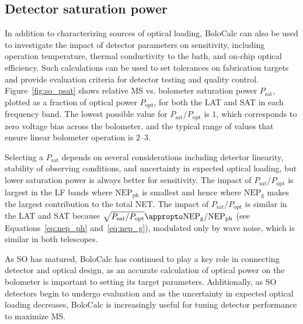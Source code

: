 
\subsection{Detector saturation power}
\label{sec:bolocalc_so_psat_optimization}

In addition to characterizing sources of optical loading, BoloCalc can also be used to investigate the impact of detector parameters on sensitivity, including operation temperature, thermal conductivity to the bath, and on-chip optical efficiency. Such calculations can be used to set tolerances on fabrication targets and provide evaluation criteria for detector testing and quality control. Figure~\ref{fig:so_psat} shows relative MS vs. bolometer saturation power $P_{\mathrm{sat}}$, plotted as a fraction of optical power $P_{\mathrm{opt}}$, for both the LAT and SAT in each frequency band. The lowest possible value for $P_{\mathrm{sat}} / P_{\mathrm{opt}}$ is $1$, which corresponds to zero voltage bias across the bolometer, and the typical range of values that ensure linear bolometer operation is 2--3. 

Selecting a $P_{\mathrm{sat}}$ depends on several considerations including detector linearity, 
stability of observing conditions,
and uncertainty in expected optical loading, but lower saturation power is always better for sensitivity. The impact of $P_{\mathrm{sat}} / P_{\mathrm{opt}}$ is largest in the LF bands where $\mathrm{NEP}_{\mathrm{ph}}$ is smallest and hence where $\mathrm{NEP}_{\mathrm{g}}$ makes the largest contribution to the total NET. The impact of $P_{\mathrm{sat}} / P_{\mathrm{opt}}$ is similar in the LAT and SAT because $\sqrt{P_{\mathrm{sat}} / P_{\mathrm{opt}}} \appropto \mathrm{NEP}_{\mathrm{g}} / \mathrm{NEP}_{\mathrm{ph}}$ (see Equations~\ref{eq:nep_ph} and~\ref{eq:nep_g}), modulated only by wave noise, which is similar in both telescopes. 

As SO has matured, BoloCalc has continued to play a key role in connecting detector and optical design, as an accurate calculation of optical power on the bolometer is important to setting its target parameters. Additionally, as SO detectors begin to undergo evaluation and as the uncertainty in expected optical loading decreases, BoloCalc is increasingly useful for tuning detector performance to maximize MS.

